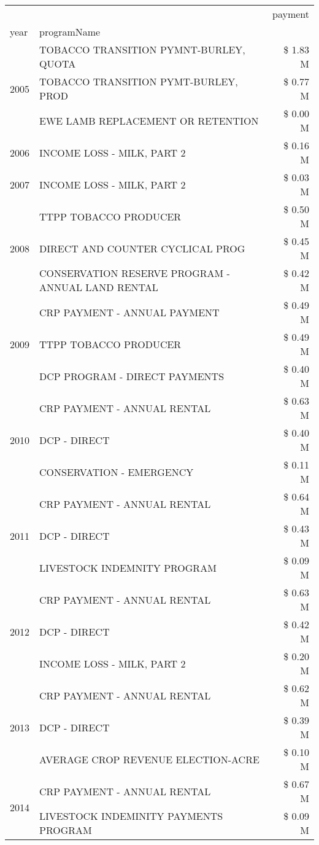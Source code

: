 \begin{tabular}{llr}
\toprule
 &  & payment \\
year & programName &  \\
\midrule
\multirow[t]{3}{*}{2005} & TOBACCO TRANSITION PYMNT-BURLEY, QUOTA & \$ 1.83 M \\
 & TOBACCO TRANSITION PYMT-BURLEY, PROD & \$ 0.77 M \\
 & EWE LAMB REPLACEMENT OR RETENTION & \$ 0.00 M \\
\cline{1-3}
2006 & INCOME LOSS - MILK, PART 2 & \$ 0.16 M \\
\cline{1-3}
2007 & INCOME LOSS - MILK, PART 2 & \$ 0.03 M \\
\cline{1-3}
\multirow[t]{3}{*}{2008} & TTPP TOBACCO PRODUCER & \$ 0.50 M \\
 & DIRECT AND COUNTER CYCLICAL PROG & \$ 0.45 M \\
 & CONSERVATION RESERVE PROGRAM - ANNUAL LAND RENTAL & \$ 0.42 M \\
\cline{1-3}
\multirow[t]{3}{*}{2009} & CRP PAYMENT - ANNUAL PAYMENT & \$ 0.49 M \\
 & TTPP TOBACCO PRODUCER & \$ 0.49 M \\
 & DCP PROGRAM - DIRECT PAYMENTS & \$ 0.40 M \\
\cline{1-3}
\multirow[t]{3}{*}{2010} & CRP PAYMENT - ANNUAL RENTAL & \$ 0.63 M \\
 & DCP - DIRECT & \$ 0.40 M \\
 & CONSERVATION - EMERGENCY & \$ 0.11 M \\
\cline{1-3}
\multirow[t]{3}{*}{2011} & CRP PAYMENT - ANNUAL RENTAL & \$ 0.64 M \\
 & DCP - DIRECT & \$ 0.43 M \\
 & LIVESTOCK INDEMNITY PROGRAM & \$ 0.09 M \\
\cline{1-3}
\multirow[t]{3}{*}{2012} & CRP PAYMENT - ANNUAL RENTAL & \$ 0.63 M \\
 & DCP - DIRECT & \$ 0.42 M \\
 & INCOME LOSS - MILK, PART 2 & \$ 0.20 M \\
\cline{1-3}
\multirow[t]{3}{*}{2013} & CRP PAYMENT - ANNUAL RENTAL & \$ 0.62 M \\
 & DCP - DIRECT & \$ 0.39 M \\
 & AVERAGE CROP REVENUE ELECTION-ACRE & \$ 0.10 M \\
\cline{1-3}
\multirow[t]{3}{*}{2014} & CRP PAYMENT - ANNUAL RENTAL & \$ 0.67 M \\
 & LIVESTOCK INDEMINITY PAYMENTS PROGRAM & \$ 0.09 M \\

\end{tabular}
